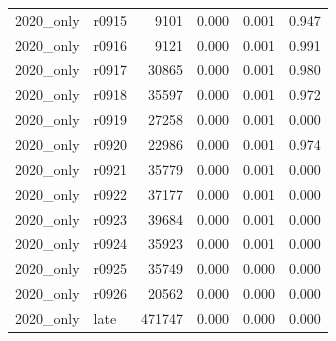 \begin{tabular}{llrrrr}
2020_only & r0915 & 9101 & 0.000 & 0.001 & 0.947 \\
2020_only & r0916 & 9121 & 0.000 & 0.001 & 0.991 \\
2020_only & r0917 & 30865 & 0.000 & 0.001 & 0.980 \\
2020_only & r0918 & 35597 & 0.000 & 0.001 & 0.972 \\
2020_only & r0919 & 27258 & 0.000 & 0.001 & 0.000 \\
2020_only & r0920 & 22986 & 0.000 & 0.001 & 0.974 \\
2020_only & r0921 & 35779 & 0.000 & 0.001 & 0.000 \\
2020_only & r0922 & 37177 & 0.000 & 0.001 & 0.000 \\
2020_only & r0923 & 39684 & 0.000 & 0.001 & 0.000 \\
2020_only & r0924 & 35923 & 0.000 & 0.001 & 0.000 \\
2020_only & r0925 & 35749 & 0.000 & 0.000 & 0.000 \\
2020_only & r0926 & 20562 & 0.000 & 0.000 & 0.000 \\
2020_only & late & 471747 & 0.000 & 0.000 & 0.000 \\
\bottomrule
\end{tabular}
